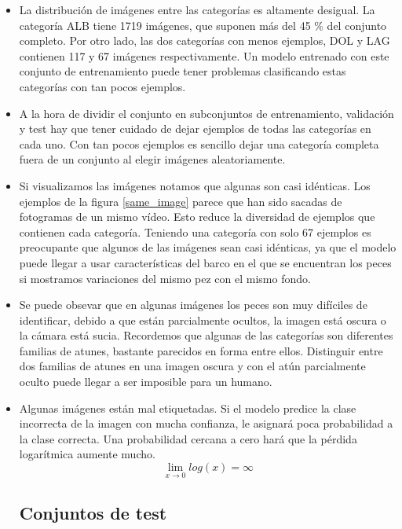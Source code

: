 \begin{itemize}
\label{problems}
    \item{La distribución de imágenes entre las categorías es altamente desigual. La
categoría ALB tiene 1719 imágenes, que suponen más del 45 \% del conjunto
completo. Por otro lado, las dos categorías con menos ejemplos, DOL y LAG
contienen 117 y 67 imágenes respectivamente. Un modelo entrenado con este
conjunto de entrenamiento puede tener problemas clasificando estas categorías
con tan pocos ejemplos.}

\item{A la hora de dividir el conjunto en subconjuntos de entrenamiento, validación y
test hay que tener cuidado de dejar ejemplos de todas las categorías en cada
uno. Con tan pocos ejemplos es sencillo dejar una categoría completa fuera de un
conjunto al elegir imágenes aleatoriamente.}

\item{Si visualizamos las imágenes notamos que algunas son casi idénticas. Los
ejemplos de la figura \ref{same_image} parece que han sido sacadas de fotogramas
de un mismo vídeo. Esto reduce la diversidad de ejemplos que contienen cada
categoría. Teniendo una categoría con solo 67 ejemplos es preocupante que
algunos de las imágenes sean casi idénticas, ya que el modelo puede llegar a
usar características del barco en el que se encuentran los peces si mostramos
variaciones del mismo pez con el mismo fondo.}

\item{Se puede obsevar que en algunas imágenes los peces son muy difíciles de
identificar, debido a que están parcialmente ocultos, la imagen está oscura o la
cámara está sucia. Recordemos que algunas de las categorías son diferentes
familias de atunes, bastante parecidos en forma entre ellos. Distinguir entre
dos familias de atunes en una imagen oscura y con el atún parcialmente oculto
puede llegar a ser imposible para un humano.}

\item{Algunas imágenes están mal etiquetadas. Si el modelo predice la clase
        incorrecta de la imagen con mucha confianza, le asignará poca
        probabilidad a la clase correcta. Una probabilidad cercana a cero hará
        que la pérdida logarítmica aumente mucho.
        \[
        \lim_{x \to 0}log(x)=\infty
        \]
}

\subsection{Conjuntos de test}


\end{itemize}
